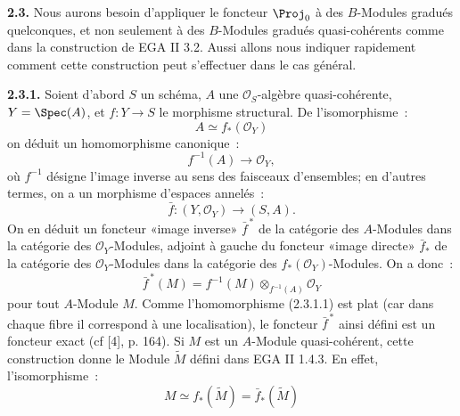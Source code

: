 \textbf{2.3.}
Nous aurons besoin d'appliquer le foncteur \(\Proj_0\) à des \(B\)-Modules gradués quelconques, et non seulement à des \(B\)-Modules gradués quasi-cohérents comme dans la construction de EGA II 3.2. Aussi allons nous indiquer rapidement comment cette construction peut s'effectuer dans le cas général.

\textbf{2.3.1.} Soient d'abord \(S\) un schéma, \(A\) une \(\mathcal O_S\)-algèbre quasi-cohérente, \(Y=\Spec(A)\), et \(f:Y\to S\) le morphisme structural. De l'isomorphisme~:
\[
  A\simeq f_*(\mathcal O_Y)
\]
on déduit un homomorphisme canonique~:
\begin{equation}\tag{2.3.1.1}
  f^{-1}(A)\longrightarrow \mathcal O_Y,
\end{equation}
où \(f^{-1}\) désigne l'image inverse au sens des faisceaux d'ensembles; en d'autres termes, on a un morphisme d'espaces annelés~:
\begin{equation}\tag{2.3.1.2}
  \bar f:(Y,\mathcal O_Y)\longrightarrow (S,A).
\end{equation}
On en déduit un foncteur «image inverse» \(\bar f^{\,*}\) de la catégorie des \(A\)-Modules dans la catégorie des \(\mathcal O_Y\)-Modules, adjoint à gauche du foncteur «image directe» \(\bar f_*\) de la catégorie des \(\mathcal O_Y\)-Modules dans la catégorie des \(f_*(\mathcal O_Y)\)-Modules. On a donc~:
\begin{equation}\tag{2.3.1.3}
  \bar f^{\,*}(M)=f^{-1}(M)\otimes_{f^{-1}(A)}\mathcal O_Y
\end{equation}
pour tout \(A\)-Module \(M\).
Comme l'homomorphisme (2.3.1.1) est plat (car dans chaque fibre il correspond à une localisation), le foncteur \(\bar f^{\,*}\) ainsi défini est un foncteur exact (cf [4], p. 164). Si \(M\) est un \(A\)-Module quasi-cohérent, cette construction donne le Module \(\widetilde M\) défini dans EGA II 1.4.3. En effet, l'isomorphisme~:
\[
  M\simeq f_*(\widetilde M)=\bar f_*(\widetilde M)
\]
